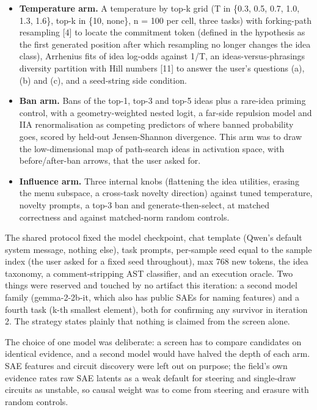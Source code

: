 \documentclass[11pt,letterpaper]{article}
\begin{document}
\begin{itemize}
\item \textbf{Temperature arm.} A temperature by top-k grid (T in \{0.3, 0.5, 0.7, 1.0, 1.3, 1.6\}, top-k in \{10, none\}, n = 100 per cell, three tasks) with forking-path resampling [4] to locate the commitment token (defined in the hypothesis as the first generated position after which resampling no longer changes the idea class), Arrhenius fits of idea log-odds against 1/T, an ideas-versus-phrasings diversity partition with Hill numbers [11] to answer the user's questions (a), (b) and (c), and a seed-string side condition.
\item \textbf{Ban arm.} Bans of the top-1, top-3 and top-5 ideas plus a rare-idea priming control, with a geometry-weighted nested logit, a far-side repulsion model and IIA renormalisation as competing predictors of where banned probability goes, scored by held-out Jensen-Shannon divergence. This arm was to draw the low-dimensional map of path-search ideas in activation space, with before/after-ban arrows, that the user asked for.
\item \textbf{Influence arm.} Three internal knobs (flattening the idea utilities, erasing the menu subspace, a cross-task novelty direction) against tuned temperature, novelty prompts, a top-3 ban and generate-then-select, at matched correctness and against matched-norm random controls.
\end{itemize}
The shared protocol fixed the model checkpoint, chat template (Qwen's default system message, nothing else), task prompts, per-sample seed equal to the sample index (the user asked for a fixed seed throughout), max 768 new tokens, the idea taxonomy, a comment-stripping AST classifier, and an execution oracle. Two things were reserved and touched by no artifact this iteration: a second model family (gemma-2-2b-it, which also has public SAEs for naming features) and a fourth task (k-th smallest element), both for confirming any survivor in iteration 2. The strategy states plainly that nothing is claimed from the screen alone.

The choice of one model was deliberate: a screen has to compare candidates on identical evidence, and a second model would have halved the depth of each arm. SAE features and circuit discovery were left out on purpose; the field's own evidence rates raw SAE latents as a weak default for steering and single-draw circuits as unstable, so causal weight was to come from steering and erasure with random controls.
\end{document}
